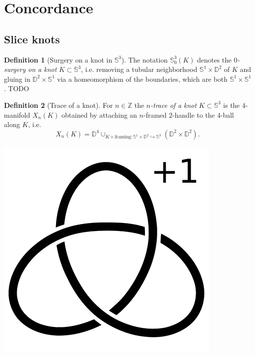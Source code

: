 \documentclass[nobib]{tufte-book} %
\theoremstyle{definition}
\newtheorem{definition}{Definition}
\theoremstyle{remark}
\newcommand{\sphere}[1]{\mathbb{S}^{#1}}
\newcommand{\disk}[1]{\mathbb{D}^{#1}}
\newcommand{\Z}{\mathbb{Z}}
\begin{document}
\section{Concordance}


\subsection{Slice knots}

\begin{definition}[Surgery on a knot in $\sphere{3}$]
	The notation $\sphere{3}_{0}(K)$ denotes the \textit{$0$-surgery on a knot}
	$K \subset \sphere{3}$, i.e. removing a tubular neighborhood
	$\sphere{1} \times \disk{2}$ of $K$ and gluing in $\disk{2} \times \sphere{1}$
	via a homeomorphism of the boundaries, which are both $\sphere{1} \times \sphere{1}$.
	TODO %
\end{definition}

\begin{definition}[Trace of a knot]
	For $n \in \Z$ the \textit{$n$-trace of a knot} 
	$K \subset \sphere{3}$
	is the $4$-manifold $X_{n}(K)$ obtained by attaching an $n$-framed $2$-handle to the $4$-ball along $K$,
	i.e. 
	\begin{equation*}
	X_{n}(K) = \disk{4} \cup_{K \times \textrm{framing} \colon \sphere{1} \times \disk{2} \hookrightarrow \sphere{3}} (\disk{2} \times \disk{2}).
	\end{equation*}
	
	\begin{marginfigure}
		\begin{center}
			\includegraphics[width=0.5\linewidth]{./pictures/right_handed_trefoil_+1_surgery.pdf}
		\end{center}
		\caption{
			A Kirby diagram for $X_{n}(K)$ is given just by the knot $K$ with the framing $n$ written next to it.
			For example, here is a Kirby diagram representing the $1$-trace
			$X_1(\textrm{right handed trefoil})$.
			The boundary of this $4$-manifold is the $+1$-surgery
			$\sphere{3}_{+1}(\textrm{right handed trefoil})$,
			a possible description of the Poincar\'e homology sphere.}
		\label{fig:right_handed_trefoil_+1_surgery}
	\end{marginfigure}
\end{definition}
\end{document}
